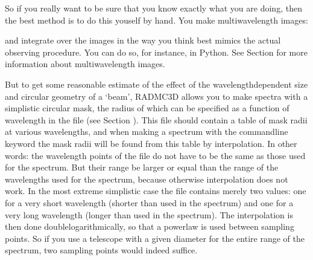 \documentclass[letterpaper,10pt,english]{sphinxmanual}
\begin{document}
So if you really want to be sure that you know exactly what you are doing, then
the best method is to do this youself by hand. You make multi\sphinxhyphen{}wavelength images:

\begin{sphinxVerbatim}[commandchars=\\\{\}]
          
\end{sphinxVerbatim}

and integrate over the images in the way you think best mimics the actual
observing procedure. You can do so, for instance, in Python.  See Section
{\hyperref[\detokenize{imagesspectra:sec-multi-wavelength-images}]{}} for more information about multi\sphinxhyphen{}wavelength
images.

But to get some reasonable estimate of the effect of the wavelength\sphinxhyphen{}dependent
size and circular geometry of a ‘beam’, RADMC\sphinxhyphen{}3D allows you to make spectra with
a simplistic circular mask, the radius of which can be specified as a function
of wavelength in the file  (see Section
{\hyperref[\detokenize{inputoutputfiles:sec-aperture-info-file}]{}}).  This file should contain a table of mask radii
at various wavelengths, and when making a spectrum with the command\sphinxhyphen{}line keyword
 the mask radii will be found from this table by interpolation. In
other words: the wavelength points of the  file do not have
to be the same as those used for the spectrum. But their range  be larger
or equal than the range of the wavelengths used for the spectrum, because
otherwise interpolation does not work. In the most extreme simplistic case the
 file contains merely two values: one for a very short
wavelength (shorter than used in the spectrum) and one for a very long
wavelength (longer than used in the spectrum). The interpolation is then done
double\sphinxhyphen{}logarithmically, so that a powerlaw is used between sampling points. So
if you use a telescope with a given diameter for the entire range of the
spectrum, two sampling points would indeed suffice.
\end{document}
